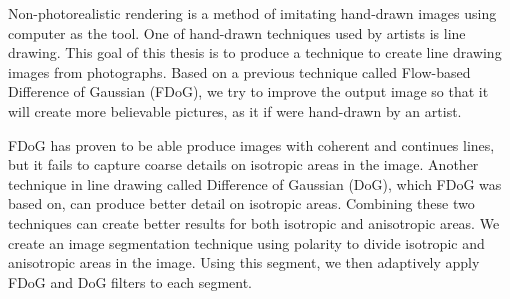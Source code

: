 	Non-photorealistic rendering is a method of imitating hand-drawn images using computer as the tool. One of hand-drawn techniques used by artists is line drawing. This goal of this thesis is to produce a technique to create line drawing images from photographs. Based on a previous technique called Flow-based Difference of Gaussian (FDoG), we try to improve the output image so that it will create more believable pictures, as it if were hand-drawn by an artist.

FDoG has proven to be able produce images with coherent and continues lines, but it fails to capture coarse details on isotropic areas in the image. Another technique in line drawing called Difference of Gaussian (DoG), which FDoG was based on, can produce better detail on isotropic areas. Combining these two techniques can create better results for both isotropic and anisotropic areas. We create an image segmentation technique using polarity to divide isotropic and anisotropic areas in the image. Using this segment, we then adaptively apply FDoG and DoG filters to each segment.